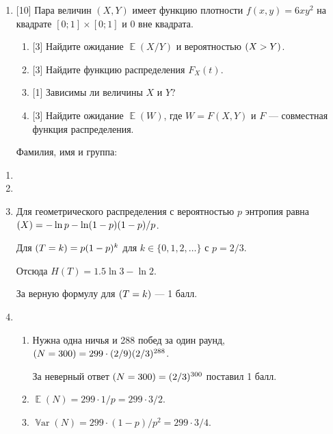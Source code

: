 \documentclass[12pt]{article}
\DeclareMathOperator{\Var}{\mathbb{V}ar}
\let\P\relax
\DeclareMathOperator{\P}{\mathbb{P}}
\let\H\relax
\DeclareMathOperator{\H}{\mathbb{H}}
\DeclareMathOperator{\E}{\mathbb{E}}
\begin{document}
\begin{enumerate}
    \item {[10]} Пара величин $(X, Y)$ имеет функцию плотности $f(x, y) = 6xy^2$ на квадрате $[0;1]\times [0;1]$ и $0$ вне квадрата. 
    \begin{enumerate}
        \item {[3]} Найдите ожидание $\E(X/Y)$ и вероятностью $\P(X > Y)$.
        \item {[3]} Найдите функцию распределения $F_X(t)$.
        \item {[1]} Зависимы ли величины $X$ и $Y$?
        \item {[3]} Найдите ожидание $\E(W)$, где $W = F(X, Y)$ и $F$ — совместная функция распределения. 
    \end{enumerate}

    \vspace{10pt}
    Фамилия, имя и группа: \dotfill

\end{enumerate}

\begin{enumerate}
    \item 
    \item 
    \item Для геометрического распределения с вероятностью $p$ 
    энтропия равна $\H(X) = -\ln p - \ln (1 - p) (1 - p) / p$.

    Для $\P(T = k) = p (1 - p)^k$ для $k \in \{0, 1, 2, \dots \}$ с $p = 2/3$.
    
    Отсюда $H(T) = 1.5 \ln 3 - \ln 2$. 
    
    За верную формулу для $\P(T = k)$ — 1 балл. 


    \item 

    \begin{enumerate}
        \item Нужна одна ничья и 288 побед за один раунд, $\P(N = 300) = 299 \cdot (2/9) (2/3)^{288}$.
        
        За неверный ответ $\P(N = 300) = (2/3)^{300}$ поставил 1 балл.
        \item $\E(N) = 299 \cdot 1/p = 299 \cdot 3 /2$.
        \item $\Var(N) = 299 \cdot (1-p)/p^2 = 299 \cdot 3/4$.
    \end{enumerate}

\end{enumerate}
\end{document}
